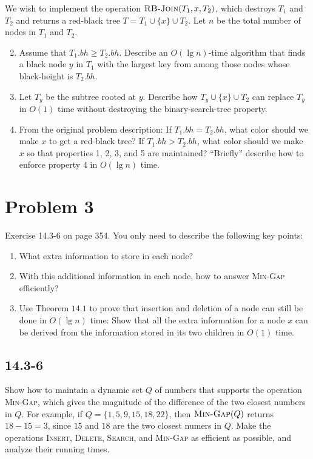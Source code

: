 \documentclass{../../class}
\begin{document}
We wish to implement the operation $\textsc{RB-Join}(T_1, x, T_2)$, which destroys $T_1$ and $T_2$ and returns a red-black tree $T = T_1 \cup \{x\} \cup T_2$. Let $n$ be the total number of nodes in $T_1$ and $T_2$.
\begin{enumerate}[label=\textbf{\textit{\alph*}}.] \setcounter{enumi}{1}
    \item Assume that $T_1.bh \geq T_2.bh$. Describe an $O(\lg{n})$-time algorithm that finds a black node $y$ in $T_1$ with the largest key from among those nodes whose black-height is $T_2.bh$.
    \item Let $T_y$ be the subtree rooted at $y$. Describe how $T_y \cup \{x\} \cup T_2$ can replace $T_y$ in $O(1)$ time without destroying the binary-search-tree property.
    \item From the original problem description: If $T_1.bh = T_2.bh$, what color should we make $x$ to get a red-black tree? If $T_1.bh > T_2.bh$, what color should we make $x$ so that properties 1, 2, 3, and 5 are maintained? \enquote{Briefly} describe how to enforce property 4 in $O(\lg{n})$ time.
\end{enumerate}

\newpage
\section*{Problem 3}
\begin{tcolorbox}
    Exercise 14.3-6 on page 354. You only need to describe the following key points:
    \begin{enumerate}
        \item What extra information to store in each node?
        \item With this additional information in each node, how to answer \textsc{Min-Gap} efficiently?
        \item Use Theorem $14.1$ to prove that insertion and deletion of a node can still be done in $O(\lg{n})$ time: Show that all the extra information for a node $x$ can be derived from the information stored in its two children in $O(1)$ time.
    \end{enumerate}
\end{tcolorbox}

\subsection*{14.3-6}
Show how to maintain a dynamic set $Q$ of numbers that supports the operation \textsc{Min-Gap}, which gives the magnitude of the difference of the two closest numbers in $Q$. For example, if $Q = \{1, 5, 9, 15, 18, 22\}$, then $\textsc{Min-Gap}(Q)$ returns $18-15=3$, since $15$ and $18$ are the two closest numers in $Q$. Make the operations \textsc{Insert}, \textsc{Delete}, \textsc{Search}, and \textsc{Min-Gap} as efficient as possible, and analyze their running times.
\end{document}
